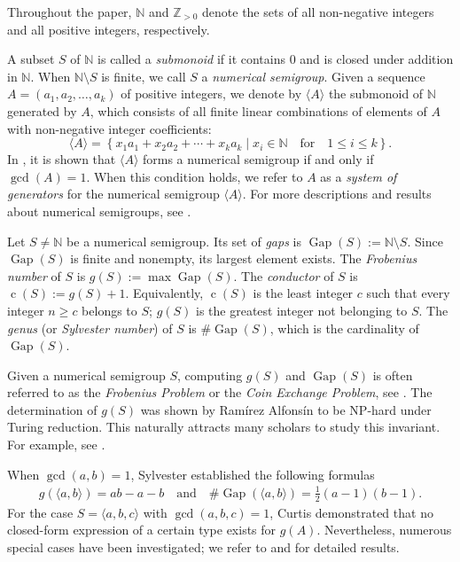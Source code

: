 \documentclass[reqno, 12pt]{article}
\numberwithin{equation}{section}
\theoremstyle{definition}
\newcommand{\NN}{\mathbb{N}}
\newcommand{\ZZ}{\mathbb{Z}}
\newcommand{\cond}{\operatorname{c}}
\newcommand{\Gap}{\operatorname{Gap}}
\begin{document}
Throughout the paper, $\mathbb{N}$ and $\ZZ_{>0}$ denote the sets of all non-negative integers and all positive integers, respectively.

A subset $S$ of $\mathbb{N}$ is called a \emph{submonoid} if it contains $0$ and is closed under addition in $\mathbb{N}$.
When $\mathbb{N}\setminus S$ is finite, we call $S$ a \emph{numerical semigroup}.
Given a sequence $A = (a_1, a_2, \ldots, a_k)$ of positive integers, we denote by $\langle A \rangle$ the submonoid of $\mathbb{N}$ generated by $A$, which consists of all finite linear combinations of elements of $A$ with non-negative integer coefficients:
$$\langle A \rangle = \left\{ x_1a_1+x_2a_2+\cdots+x_ka_k \mid x_i \in \mathbb{N}\quad \text{for}\quad 1 \leq i \leq k \right\}.$$
In \cite[Lemma 2.1]{J.C.Rosales}, it is shown that $\langle A\rangle$ forms a numerical semigroup if and only if $\gcd(A)=1$.
When this condition holds, we refer to $A$ as a \emph{system of generators} for the numerical semigroup $\langle A\rangle$.
For more descriptions and results about numerical semigroups, see \cite{Ramrez Alfonsn,A.Assi,J.C.Rosales}.


Let $S\neq\NN$ be a numerical semigroup.  Its set of \emph{gaps} is $\Gap(S):=\NN\setminus S$.
Since $\Gap(S)$ is finite and nonempty, its largest element exists.  The \emph{Frobenius number} of $S$ is $g(S):=\max\Gap(S)$.
The \emph{conductor} of $S$ is $\cond(S):=g(S)+1$.
Equivalently, $\cond(S)$ is the least integer $c$ such that every integer $n\ge c$ belongs to $S$; $g(S)$ is the greatest integer not belonging to $S$.
The \emph{genus} (or \emph{Sylvester number}) of $S$ is $\# \Gap(S)$, which is the cardinality of $\Gap(S)$.

Given a numerical semigroup $S$, computing $g(S)$ and $\Gap(S)$ is often referred to as the \emph{Frobenius Problem} or the \emph{Coin Exchange Problem}, see \cite{Ramrez Alfonsn}. The determination of $g(S)$ was shown by Ram\'irez Alfons\'in \cite{RamrezAlfonsn-Combin} to be NP-hard under Turing reduction.
This naturally attracts many scholars to study this invariant.
For example, see \cite{J. E. Shockley,LiuSemigroupF,Rosales2015,Rosales.Repunit,Rosales2016,E. S. Selmer}.

When $\gcd(a,b)=1$, Sylvester \cite{J.J.Sylvester,J.J.Sylvester1} established the following formulas 
\begin{align*}
g(\langle a,b\rangle) = ab - a - b \quad \text{and} \quad \# \Gap(\langle a,b\rangle) = \frac{1}{2}(a-1)(b-1).
\end{align*}
For the case $S=\langle a,b,c\rangle$ with $\gcd(a,b,c)=1$, Curtis \cite{F.Curtis} demonstrated that no closed-form expression of a certain type exists for $g(A)$. Nevertheless, numerous special cases have been investigated; we refer to \cite[Section 2; Section 3]{Ramrez Alfonsn} and \cite{Liu-Xin} for detailed results.
\end{document}
